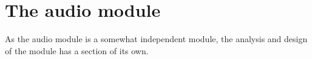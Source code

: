 





 





\clearpage
\tableofcontents







	
	


\section{The audio module}
As the audio module is a somewhat independent module, the analysis and design
of the module has a section of its own.
 	
	
	
	
	
	
	


	
	
	














